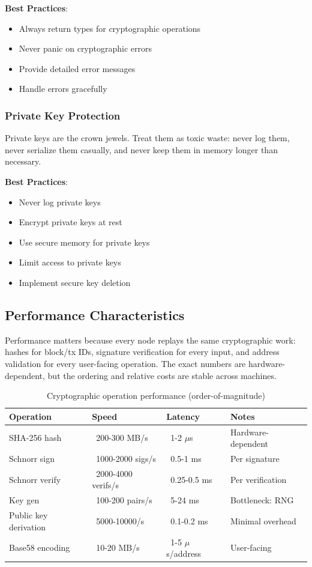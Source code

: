 \textbf{Best Practices}:
\begin{itemize}
  \item Always return  types for cryptographic operations
  \item Never panic on cryptographic errors
  \item Provide detailed error messages
  \item Handle errors gracefully
\end{itemize}

\subsubsection{Private Key Protection}
\label{sec:ch08-private-key-protection}

Private keys are the crown jewels. Treat them as toxic waste: never log them, never serialize them casually, and never keep them in memory longer than necessary.

\textbf{Best Practices}:
\begin{itemize}
  \item Never log private keys
  \item Encrypt private keys at rest
  \item Use secure memory for private keys
  \item Limit access to private keys
  \item Implement secure key deletion
\end{itemize}

\subsection{Performance Characteristics}
\label{sec:ch08-performance}

Performance matters because every node replays the same cryptographic work: hashes for block/tx IDs, signature verification for every input, and address validation for every user-facing operation. The exact numbers are hardware-dependent, but the ordering and relative costs are stable across machines.

\begin{table}[htbp]
\caption{Cryptographic operation performance (order-of-magnitude)}
\label{tab:ch08-perf}
\centering\small
\begin{tabularx}{0.95\textwidth}{lXXX}
\toprule
\textbf{Operation} & \textbf{Speed} & \textbf{Latency} & \textbf{Notes} \\
\midrule
SHA-256 hash & ~200-300 MB/s & ~1-2 $\mu$s & Hardware-dependent \\
Schnorr sign & ~1000-2000 sigs/s & ~0.5-1 ms & Per signature \\
Schnorr verify & ~2000-4000 verifs/s & ~0.25-0.5 ms & Per verification \\
Key gen & ~100-200 pairs/s & ~5-24 ms & Bottleneck: RNG \\
Public key derivation & ~5000-10000/s & ~0.1-0.2 ms & Minimal overhead \\
Base58 encoding & ~10-20 MB/s & ~1-5 $\mu$s/address & User-facing \\
\bottomrule
\end{tabularx}
\end{table}

